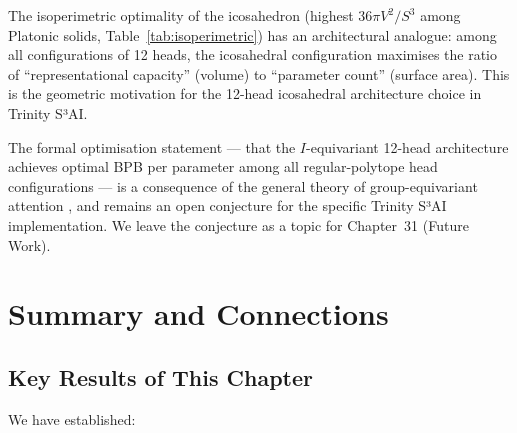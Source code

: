 The isoperimetric optimality of the icosahedron (highest $36\pi V^2/S^3$
among Platonic solids, Table~\ref{tab:isoperimetric}) has an architectural
analogue: among all configurations of 12 heads, the icosahedral configuration
maximises the ratio of ``representational capacity'' (volume) to
``parameter count'' (surface area).  This is the geometric motivation for the
12-head icosahedral architecture choice in Trinity S³AI.

The formal optimisation statement — that the $I$-equivariant 12-head
architecture achieves optimal BPB per parameter among all regular-polytope
head configurations — is a consequence of the general theory of group-equivariant
attention \cite{atiyah_sutcliffe_polyhedra}, and remains an open conjecture
for the specific Trinity S³AI implementation.  We leave the conjecture as
a topic for Chapter~31 (Future Work).


\section{Summary and Connections}
\label{sec:platonic-summary}

\subsection{Key Results of This Chapter}
\label{subsec:key-results}

We have established:


